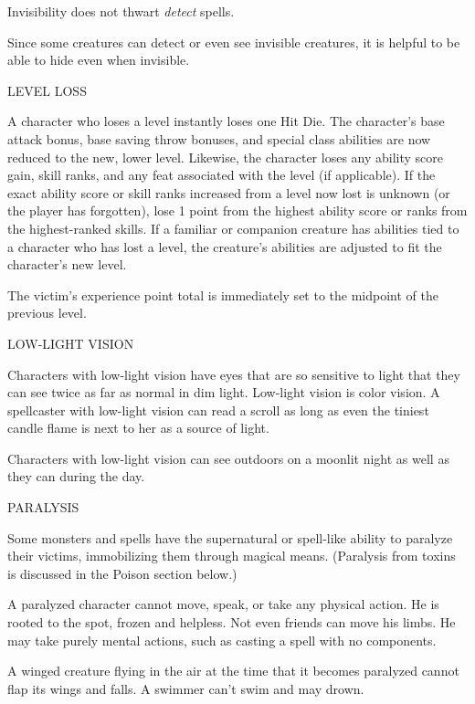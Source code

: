 \documentclass{article}
\begin{document}
Invisibility does not thwart \textit{detect }spells.

Since some creatures can detect or even see invisible creatures, it is helpful 
to be able to hide even when invisible.

\vspace{12pt}
LEVEL LOSS

A character who loses a level instantly loses one Hit Die. The character's base 
attack bonus, base saving throw bonuses, and special class abilities are now reduced 
to the new, lower level. Likewise, the character loses any ability score gain, 
skill ranks, and any feat associated with the level (if applicable). If the exact 
ability score or skill ranks increased from a level now lost is unknown (or the 
player has forgotten), lose 1 point from the highest ability score or ranks from 
the highest-ranked skills. If a familiar or companion creature has abilities tied 
to a character who has lost a level, the creature's abilities are adjusted to fit 
the character's new level.

The victim's experience point total is immediately set to the midpoint of the previous 
level.

\vspace{12pt}
LOW-LIGHT VISION

Characters with low-light vision have eyes that are so sensitive to light that 
they can see twice as far as normal in dim light. Low-light vision is color vision. 
A spellcaster with low-light vision can read a scroll as long as even the tiniest 
candle flame is next to her as a source of light.

Characters with low-light vision can see outdoors on a moonlit night as well as 
they can during the day.

\vspace{12pt}
PARALYSIS

Some monsters and spells have the supernatural or spell-like ability to paralyze 
their victims, immobilizing them through magical means. (Paralysis from toxins 
is discussed in the Poison section below.)

A paralyzed character cannot move, speak, or take any physical action. He is rooted 
to the spot, frozen and helpless. Not even friends can move his limbs. He may take 
purely mental actions, such as casting a spell with no components.

A winged creature flying in the air at the time that it becomes paralyzed cannot 
flap its wings and falls. A swimmer can't swim and may drown.
\end{document}
